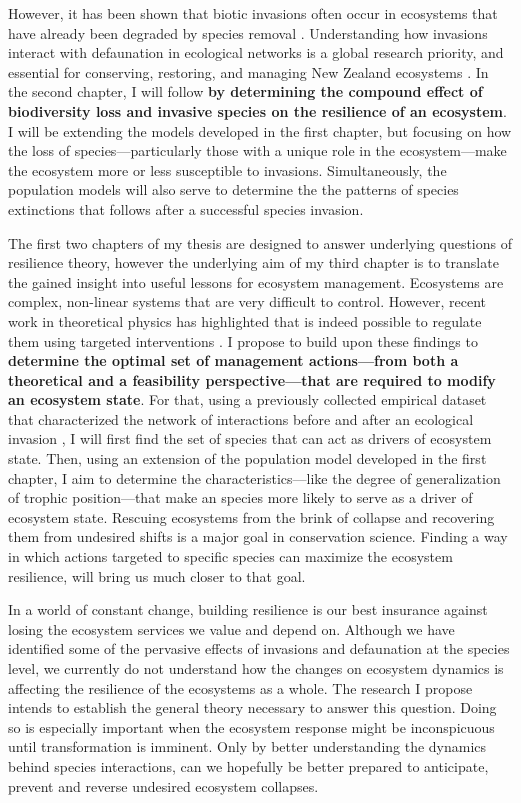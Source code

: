 \documentclass[a4paper]{article}
\begin{document}
However, it has been shown that biotic invasions often occur in ecosystems that have already been degraded by species removal \citep{Bennett2015}.
Understanding how invasions interact with defaunation in ecological networks is a global research priority, and essential for conserving, restoring, and managing New Zealand ecosystems \citep{Newstrom2005}.
In the second chapter, I will follow \textbf{by determining the compound effect of biodiversity loss and invasive species on the resilience of an ecosystem}.
I will be extending the models developed in the first chapter, but focusing on how the loss of species---particularly those with a unique role in the ecosystem---make the ecosystem more or less susceptible to invasions.
Simultaneously, the population models will also serve to determine the the patterns of species extinctions that follows after a successful species invasion.

The first two chapters of my thesis are designed to answer underlying questions of resilience theory, however the underlying aim of my third chapter is to translate the gained insight into useful lessons for ecosystem management.
Ecosystems are complex, non-linear systems that are very difficult to control.
However, recent work in theoretical physics has highlighted that is indeed possible to regulate them using targeted interventions \citep{Cornelius2013}.
I propose to build upon these findings to \textbf{determine the optimal set of management actions---from both a theoretical and a feasibility perspective---that are required to modify an ecosystem state}.
For that, using a previously collected empirical dataset that characterized the network of interactions before and after an ecological invasion \citep{Bartomeus2008}, I will first find the set of species that can act as drivers of ecosystem state.
Then, using an extension of the population model developed in the first chapter, I aim to determine the characteristics---like the degree of generalization of trophic position---that make an species more likely to serve as a driver of ecosystem state.
Rescuing ecosystems from the brink of collapse and recovering them from undesired shifts is a major goal in conservation science.
Finding a way in which actions targeted to specific species can maximize the ecosystem resilience, will bring us much closer to that goal.

In a world of constant change, building resilience is our best insurance against losing the ecosystem services we value and depend on.
Although we have identified some of the pervasive effects of invasions and defaunation at the species level, we currently do not understand how the changes on ecosystem dynamics is affecting the resilience of the ecosystems as a whole.
The research I propose intends to establish the general theory necessary to answer this question.
Doing so is especially important when the ecosystem response might be inconspicuous until transformation is imminent.
Only by better understanding the dynamics behind species interactions, can we hopefully be better prepared to anticipate, prevent and reverse undesired ecosystem collapses.
\end{document}
